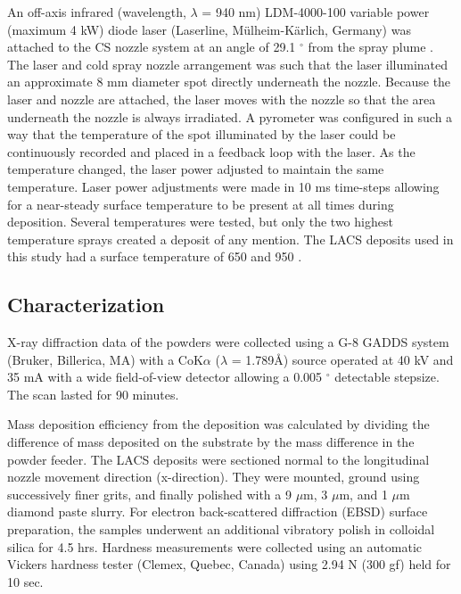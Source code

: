 		
		
			An off-axis infrared (wavelength, $ \lambda $  = 940 nm) LDM-4000-100 variable power (maximum 4 kW) diode laser (Laserline, Mülheim-Kärlich, Germany) was attached to the CS nozzle system at an angle of 29.1 $ ^{\circ} $  from the spray plume \cite{RN720}. The laser and cold spray nozzle arrangement was such that the laser illuminated an approximate 8 mm diameter spot directly underneath the nozzle. Because the laser and nozzle are attached, the laser moves with the nozzle so that the area underneath the nozzle is always irradiated. A pyrometer was configured in such a way that the temperature of the spot illuminated by the laser could be continuously recorded and placed in a feedback loop with the laser. As the temperature changed, the laser power adjusted to maintain the same temperature. Laser power adjustments were made in 10 ms time-steps allowing for a near-steady surface temperature to be present at all times during deposition. Several temperatures were tested, but only the two highest temperature sprays created a deposit of any mention. The LACS deposits used in this study had a surface temperature of 650 \celsius{} and 950 \celsius{}.



	 \subsection*{Characterization} 



		X-ray diffraction data of the powders were collected using a G-8 GADDS system (Bruker, Billerica, MA) with a CoK$ \alpha $  ($ \lambda $  = 1.789Å) source operated at 40 kV and 35 mA with a wide field-of-view detector allowing a 0.005 $ ^{\circ} $  detectable stepsize. The scan lasted for 90 minutes.
	
	
	
		Mass deposition efficiency from the deposition was calculated by dividing the difference of mass deposited on the substrate by the mass difference in the powder feeder. The LACS deposits were sectioned normal to the longitudinal nozzle movement direction (x-direction). They were mounted, ground using successively finer grits, and finally polished with a 9  $ \mu $m, 3  $ \mu $m, and 1  $ \mu $m diamond paste slurry. For electron back-scattered diffraction (EBSD) surface preparation, the samples underwent an additional vibratory polish in colloidal silica for 4.5 hrs. Hardness measurements were collected using an automatic Vickers hardness tester (Clemex, Quebec, Canada) using 2.94 N (300 gf) held for 10 sec.
	
